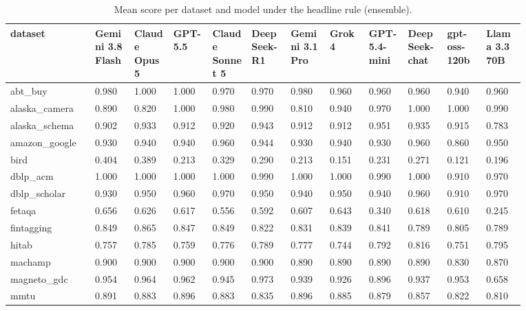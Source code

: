 \begin{landscape}
\tiny
\setlength{\tabcolsep}{3pt}
\begin{longtable}{p{0.134\linewidth}p{0.067\linewidth}p{0.067\linewidth}p{0.067\linewidth}p{0.067\linewidth}p{0.067\linewidth}p{0.067\linewidth}p{0.067\linewidth}p{0.067\linewidth}p{0.067\linewidth}p{0.067\linewidth}p{0.067\linewidth}}
\caption{Mean score per dataset and model under the headline rule (ensemble).}\label{tab:per_dataset_mean_ensemble}\\
\toprule
dataset & Gemini 3.8 Flash & Claude Opus 5 & GPT-5.5 & Claude Sonnet 5 & DeepSeek-R1 & Gemini 3.1 Pro & Grok 4 & GPT-5.4-mini & DeepSeek-chat & gpt-oss-120b & Llama 3.3 70B \\
\midrule
abt\_\allowbreak{}buy & 0.980 & 1.000 & 1.000 & 0.970 & 0.970 & 0.980 & 0.960 & 0.960 & 0.960 & 0.940 & 0.960 \\
alaska\_\allowbreak{}camera & 0.890 & 0.820 & 1.000 & 0.980 & 0.990 & 0.810 & 0.940 & 0.970 & 1.000 & 1.000 & 0.990 \\
alaska\_\allowbreak{}schema & 0.902 & 0.933 & 0.912 & 0.920 & 0.943 & 0.912 & 0.912 & 0.951 & 0.935 & 0.915 & 0.783 \\
amazon\_\allowbreak{}google & 0.930 & 0.940 & 0.940 & 0.960 & 0.944 & 0.930 & 0.940 & 0.930 & 0.960 & 0.860 & 0.950 \\
bird & 0.404 & 0.389 & 0.213 & 0.329 & 0.290 & 0.213 & 0.151 & 0.231 & 0.271 & 0.121 & 0.196 \\
dblp\_\allowbreak{}acm & 1.000 & 1.000 & 1.000 & 1.000 & 0.990 & 1.000 & 1.000 & 0.990 & 1.000 & 0.910 & 0.970 \\
dblp\_\allowbreak{}scholar & 0.930 & 0.950 & 0.960 & 0.970 & 0.950 & 0.940 & 0.950 & 0.940 & 0.960 & 0.910 & 0.970 \\
fetaqa & 0.656 & 0.626 & 0.617 & 0.556 & 0.592 & 0.607 & 0.643 & 0.340 & 0.618 & 0.610 & 0.245 \\
fintagging & 0.849 & 0.865 & 0.847 & 0.849 & 0.822 & 0.831 & 0.839 & 0.841 & 0.789 & 0.805 & 0.789 \\
hitab & 0.757 & 0.785 & 0.759 & 0.776 & 0.789 & 0.777 & 0.744 & 0.792 & 0.816 & 0.751 & 0.795 \\
machamp & 0.900 & 0.900 & 0.900 & 0.900 & 0.900 & 0.890 & 0.890 & 0.890 & 0.890 & 0.830 & 0.870 \\
magneto\_\allowbreak{}gdc & 0.954 & 0.964 & 0.962 & 0.945 & 0.973 & 0.939 & 0.926 & 0.896 & 0.937 & 0.953 & 0.658 \\
mmtu & 0.891 & 0.883 & 0.896 & 0.883 & 0.835 & 0.896 & 0.885 & 0.879 & 0.857 & 0.822 & 0.810 \\

\end{longtable}
\end{landscape}
